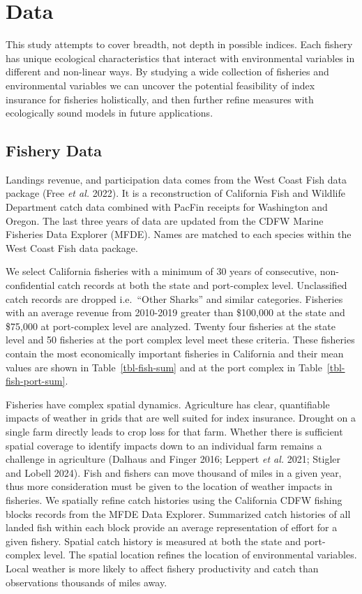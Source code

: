 \documentclass[
  letterpaper,
  DIV=11,
  numbers=noendperiod]{scrartcl}
\begin{document}
\hypertarget{sec-data}{%
\section{Data}\label{sec-data}}

This study attempts to cover breadth, not depth in possible indices.
Each fishery has unique ecological characteristics that interact with
environmental variables in different and non-linear ways. By studying a
wide collection of fisheries and environmental variables we can uncover
the potential feasibility of index insurance for fisheries holistically,
and then further refine measures with ecologically sound models in
future applications.

\hypertarget{fishery-data}{%
\subsection{Fishery Data}\label{fishery-data}}

Landings revenue, and participation data comes from the West Coast Fish
data package (Free \emph{et al.} 2022). It is a reconstruction of
California Fish and Wildlife Department catch data combined with PacFin
receipts for Washington and Oregon. The last three years of data are
updated from the CDFW Marine Fisheries Data Explorer (MFDE). Names are
matched to each species within the West Coast Fish data package.

We select California fisheries with a minimum of 30 years of
consecutive, non-confidential catch records at both the state and
port-complex level. Unclassified catch records are dropped i.e.~``Other
Sharks'' and similar categories. Fisheries with an average revenue from
2010-2019 greater than \$100,000 at the state and \$75,000 at
port-complex level are analyzed. Twenty four fisheries at the state
level and 50 fisheries at the port complex level meet these criteria.
These fisheries contain the most economically important fisheries in
California and their mean values are shown in Table~\ref{tbl-fish-sum}
and at the port complex in Table~\ref{tbl-fish-port-sum}.

Fisheries have complex spatial dynamics. Agriculture has clear,
quantifiable impacts of weather in grids that are well suited for index
insurance. Drought on a single farm directly leads to crop loss for that
farm. Whether there is sufficient spatial coverage to identify impacts
down to an individual farm remains a challenge in agriculture (Dalhaus
and Finger 2016; Leppert \emph{et al.} 2021; Stigler and Lobell 2024).
Fish and fishers can move thousand of miles in a given year, thus more
consideration must be given to the location of weather impacts in
fisheries. We spatially refine catch histories using the California CDFW
fishing blocks records from the MFDE Data Explorer. Summarized catch
histories of all landed fish within each block provide an average
representation of effort for a given fishery. Spatial catch history is
measured at both the state and port-complex level. The spatial location
refines the location of environmental variables. Local weather is more
likely to affect fishery productivity and catch than observations
thousands of miles away.
\end{document}
